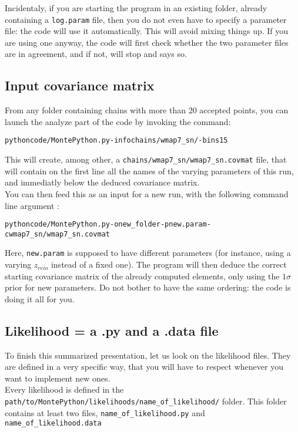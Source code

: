 \documentclass[10pt]{article}
\begin{document}
  Incidentaly, if you are starting the program in an existing folder, already
  containing a \verb?log.param? file, then you do not even have to specify a
  parameter file: the code will use it automatically. This will avoid mixing
  things up. If you are using one anyway, the code will first check whether the
  two parameter files are in agreement, and if not, will stop and says so.\\

  \subsection{Input covariance matrix}

  From any folder containing chains with more than 20 accepted points, you can launch the analyze part of the code by invoking the command:
  \begin{alltt}
    python code/MontePython.py -info chains/wmap7_sn/ -bins 15
  \end{alltt}
  This will create, among other, a \verb?chains/wmap7_sn/wmap7_sn.covmat? file,
  that will contain on the first line all the names of the varying parameters
  of this run, and immediatly below the deduced covariance matrix.\\

  You can then feed this as an input for a new run, with the following command
  line argument :
  \begin{alltt}
    python code/MontePython.py -o new_folder -p new.param -c wmap7_sn/wmap7_sn.covmat
  \end{alltt}
  Here, \verb?new.param? is supposed to have different parameters (for
  instance, using a varying $z_{reio}$ instead of a fixed one). The program
  will then deduce the correct starting covariance matrix of the already
  computed elements, only using the $1\sigma$ prior for new parameters. Do not
  bother to have the same ordering: the code is doing it all for you.

  \subsection{Likelihood = a .py and a .data file\label{ssec:lkl}}

  To finish this summarized presentation, let us look on the likelihood files.
  They are defined in a very specific way, that you will have to respect
  whenever you want to implement new ones.\\

  Every likelihood is defined in the
  \verb?path/to/MontePython/likelihoods/name_of_likelihood/?
  folder. This folder contains at least two files, \verb?name_of_likelihood.py?
  and \verb?name_of_likelihood.data?\\
\end{document}
